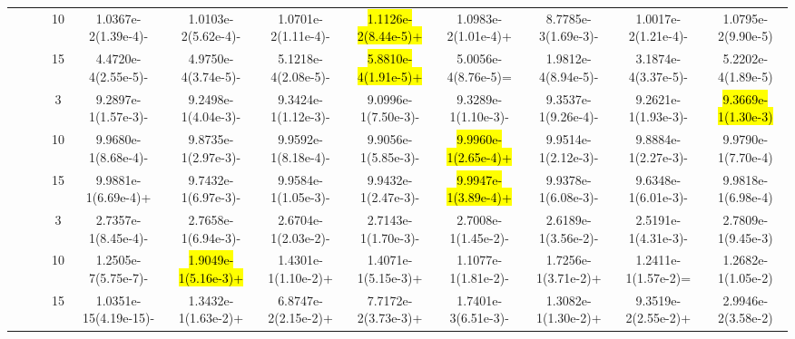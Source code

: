\documentclass[a4paper,fleqn]{cas-dc}
\newcommand{\highlight}[1]{
	\begingroup
	\sethlcolor{Seashell}%
	\hl{#1}%
	\endgroup
}
\begin{document}
\begin{sloppypar}
\begin{table}[ht]
{\begin{tabular}{ccccccccccc}
					\multirow{6}{*}{~}&\multirow{3}{*}{~} &10 &1.0367e-2(1.39e-4)-		&1.0103e-2(5.62e-4)-	&1.0701e-2(1.11e-4)-	&\highlight{1.1126e-2(8.44e-5)+}	&1.0983e-2(1.01e-4)+	&8.7785e-3(1.69e-3)-	&1.0017e-2(1.21e-4)-	&1.0795e-2(9.90e-5)\\
					
					
					\multirow{6}{*}{~}&\multirow{3}{*}{~} &15 &4.4720e-4(2.55e-5)-		&4.9750e-4(3.74e-5)-	&5.1218e-4(2.08e-5)-	&\highlight{5.8810e-4(1.91e-5)+}	&5.0056e-4(8.76e-5)=	&1.9812e-4(8.94e-5)-	&3.1874e-4(3.37e-5)-	&5.2202e-4(1.89e-5)\\
					\midrule[0.35pt]
					
					
					\multirow{12}{*}{Disconnected}&\multirow{3}{*}{WFG2} &3 &9.2897e-1(1.57e-3)-	&9.2498e-1(4.04e-3)-	&9.3424e-1(1.12e-3)-	&9.0996e-1(7.50e-3)-	&9.3289e-1(1.10e-3)-	&9.3537e-1(9.26e-4)-	&9.2621e-1(1.93e-3)-	&\highlight{9.3669e-1(1.30e-3)}\\
					
					\multirow{12}{*}{~}&\multirow{3}{*}{~} &10 &9.9680e-1(8.68e-4)-		&9.8735e-1(2.97e-3)-	&9.9592e-1(8.18e-4)-	&9.9056e-1(5.85e-3)-	&\highlight{9.9960e-1(2.65e-4)+}	&9.9514e-1(2.12e-3)-	&9.8884e-1(2.27e-3)-	&9.9790e-1(7.70e-4)\\
					
					\multirow{12}{*}{~}&\multirow{3}{*}{~} &15&9.9881e-1(6.69e-4)+		&9.7432e-1(6.97e-3)-	&9.9584e-1(1.05e-3)-	&9.9432e-1(2.47e-3)-	&\highlight{9.9947e-1(3.89e-4)+}	&9.9378e-1(6.08e-3)-	&9.6348e-1(6.01e-3)-	&9.9818e-1(6.98e-4)\\
					
					
					
					
					\multirow{12}{*}{~}&\multirow{3}{*}{MaF7} &3    &2.7357e-1(8.45e-4)-		&2.7658e-1(6.94e-3)-	&2.6704e-1(2.03e-2)-	&2.7143e-1(1.70e-3)-	&2.7008e-1(1.45e-2)-	&2.6189e-1(3.56e-2)-	&2.5191e-1(4.31e-3)-	&2.7809e-1(9.45e-3)\\ 
					
					\multirow{12}{*}{~}&\multirow{3}{*}{~} &10 	&1.2505e-7(5.75e-7)-		&\highlight{1.9049e-1(5.16e-3)+}	&1.4301e-1(1.10e-2)+	&1.4071e-1(5.15e-3)+	&1.1077e-1(1.81e-2)-	&1.7256e-1(3.71e-2)+	&1.2411e-1(1.57e-2)=	&1.2682e-1(1.05e-2)\\
					
					\multirow{12}{*}{~}&\multirow{3}{*}{~} &15	&1.0351e-15(4.19e-15)-		&1.3432e-1(1.63e-2)+	&6.8747e-2(2.15e-2)+	&7.7172e-2(3.73e-3)+	&1.7401e-3(6.51e-3)-	&1.3082e-1(1.30e-2)+	&9.3519e-2(2.55e-2)+	&2.9946e-2(3.58e-2)\\
					

\end{tabular}}
\end{table}
\end{sloppypar}
\end{document}
